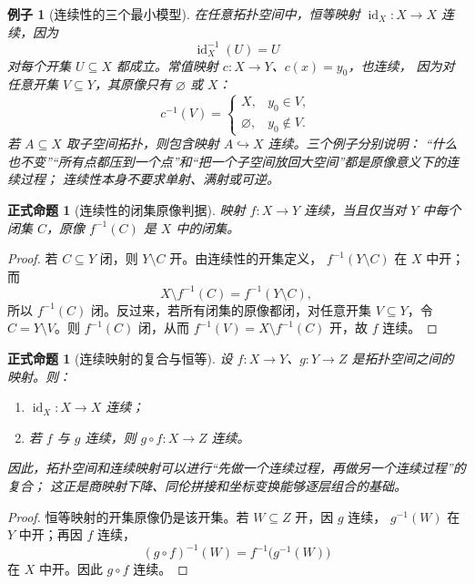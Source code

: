\documentclass[UTF8,fontset=none,a4paper,11pt]{ctexart}
\theoremstyle{foundation-definition}
\theoremstyle{foundation-theorem}
\theoremstyle{foundation-proposition}
\newtheorem{proposition}[definition]{正式命题}
\theoremstyle{foundation-example}
\newtheorem{example}[definition]{例子}
\theoremstyle{foundation-remark}
\theoremstyle{foundation-theorem}
\begin{document}
\begin{example}[连续性的三个最小模型]\label{ex:continuous-basic-models}
在任意拓扑空间中，恒等映射 \(\operatorname{id}_X:X\to X\) 连续，因为
\[
  \operatorname{id}_X^{-1}(U)=U
\]
对每个开集 \(U\subseteq X\) 都成立。常值映射 \(c:X\to Y\)、\(c(x)=y_0\)，也连续，
因为对任意开集 \(V\subseteq Y\)，其原像只有 \(\varnothing\) 或 \(X\)：
\[
  c^{-1}(V)=
  \begin{cases}
  X,&y_0\in V,\\
  \varnothing,&y_0\notin V.
  \end{cases}
\]
若 \(A\subseteq X\) 取子空间拓扑，则包含映射 \(A\hookrightarrow X\) 连续。三个例子分别说明：
“什么也不变”“所有点都压到一个点”和“把一个子空间放回大空间”都是原像意义下的连续过程；
连续性本身不要求单射、满射或可逆。
\end{example}

\begin{proposition}[连续性的闭集原像判据]
\label{prop:continuous-closed-preimage}
映射 \(f:X\to Y\) 连续，当且仅当对 \(Y\) 中每个闭集 \(C\)，原像
\(f^{-1}(C)\) 是 \(X\) 中的闭集。
\end{proposition}

\begin{proof}
若 \(C\subseteq Y\) 闭，则 \(Y\setminus C\) 开。由连续性的开集定义，
\(f^{-1}(Y\setminus C)\) 在 \(X\) 中开；而
\[
X\setminus f^{-1}(C)=f^{-1}(Y\setminus C),
\]
所以 \(f^{-1}(C)\) 闭。反过来，若所有闭集的原像都闭，对任意开集
\(V\subseteq Y\)，令 \(C=Y\setminus V\)。则 \(f^{-1}(C)\) 闭，从而
\(f^{-1}(V)=X\setminus f^{-1}(C)\) 开，故 \(f\) 连续。
\end{proof}

\begin{proposition}[连续映射的复合与恒等]\label{prop:continuous-composition}
设 \(f:X\to Y\)、\(g:Y\to Z\) 是拓扑空间之间的映射。则：
\begin{enumerate}[label=(\alph*)]
  \item \(\operatorname{id}_X:X\to X\) 连续；
  \item 若 \(f\) 与 \(g\) 连续，则 \(g\circ f:X\to Z\) 连续。
\end{enumerate}
因此，拓扑空间和连续映射可以进行“先做一个连续过程，再做另一个连续过程”的复合；
这正是商映射下降、同伦拼接和坐标变换能够逐层组合的基础。
\end{proposition}

\begin{proof}
恒等映射的开集原像仍是该开集。若 \(W\subseteq Z\) 开，因 \(g\) 连续，
\(g^{-1}(W)\) 在 \(Y\) 中开；再因 \(f\) 连续，
\[
  (g\circ f)^{-1}(W)=f^{-1}\bigl(g^{-1}(W)\bigr)
\]
在 \(X\) 中开。因此 \(g\circ f\) 连续。
\end{proof}
\end{document}
